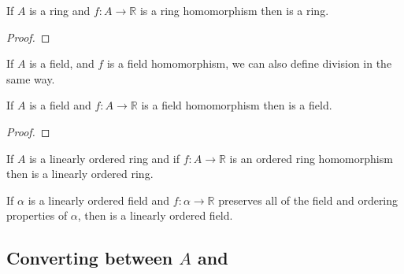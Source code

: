 \begin{lemma}
  \label{thm:filteredRing}
  \leanok
  If $A$ is a ring and $f : A → ℝ$ is a ring homomorphism then 
  is a ring.
\end{lemma}

\begin{proof}
  \notready
\end{proof}

\begin{definition}
  \label{def:filteredInv}
  If $A$ is a field, and $f$ is a field homomorphism, we can also define
  division in the same way.
\end{definition}

\begin{lemma}
  \label{thm:filteredField}
  \leanok
  If $A$ is a field and $f : A → ℝ$ is a field homomorphism then 
  is a field.
\end{lemma}

\begin{proof}
  \notready
\end{proof}

\begin{definition}
  \label{def:filteredCompare}
  \notready
\end{definition}

\begin{lemma}
  \label{thm:filteredOrderedRing}
  \leanok
  If $A$ is a linearly ordered ring and if $f : A → ℝ$ is an ordered ring
  homomorphism then  is a linearly ordered ring.
\end{lemma}

\begin{theorem}
  \label{thm:filteredOrderedField}
  \leanok
  If $α$ is a linearly ordered field and $f : α → ℝ$ preserves all of the field
  and ordering properties of $α$, then  is a linearly
  ordered field.
\end{theorem}

\subsection{Converting between $A$ and }

